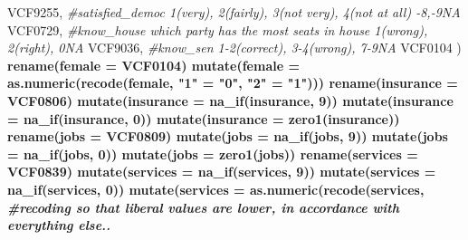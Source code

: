 \documentclass[
]{article}
\newenvironment{Shaded}{\begin{snugshade}}{\end{snugshade}}
\newcommand{\CommentTok}[1]{\textcolor[rgb]{0.56,0.35,0.01}{\textit{#1}}}
\newcommand{\DataTypeTok}[1]{\textcolor[rgb]{0.13,0.29,0.53}{#1}}
\newcommand{\DecValTok}[1]{\textcolor[rgb]{0.00,0.00,0.81}{#1}}
\newcommand{\KeywordTok}[1]{\textcolor[rgb]{0.13,0.29,0.53}{\textbf{#1}}}
\newcommand{\NormalTok}[1]{#1}
\newcommand{\OperatorTok}[1]{\textcolor[rgb]{0.81,0.36,0.00}{\textbf{#1}}}
\newcommand{\StringTok}[1]{\textcolor[rgb]{0.31,0.60,0.02}{#1}}
\begin{document}
\begin{Shaded}
\begin{Highlighting}[]
{{{{{{{{{{{{{{{\NormalTok{                 VCF9255, }\CommentTok{#satisfied_democ 1(very), 2(fairly), 3(not very), 4(not at all) -8,-9NA}
\NormalTok{                 VCF0729, }\CommentTok{#know_house which party has the most seats in house 1(wrong), 2(right), 0NA}
\NormalTok{                 VCF9036, }\CommentTok{#know_sen 1-2(correct), 3-4(wrong), 7-9NA}
\NormalTok{                 VCF0104}
\NormalTok{    )}\OperatorTok{%>%}
\StringTok{    }\KeywordTok{rename}\NormalTok{(}\DataTypeTok{female =}\NormalTok{ VCF0104)}\OperatorTok{%>%}
\StringTok{    }\KeywordTok{mutate}\NormalTok{(}\DataTypeTok{female =} \KeywordTok{as.numeric}\NormalTok{(}\KeywordTok{recode}\NormalTok{(female, }
                                                                        \StringTok{"1"}\NormalTok{ =}\StringTok{ "0"}\NormalTok{,}
                                                                        \StringTok{"2"}\NormalTok{ =}\StringTok{ "1"}\NormalTok{)))}\OperatorTok{%>%}
\StringTok{    }\KeywordTok{rename}\NormalTok{(}\DataTypeTok{insurance =}\NormalTok{ VCF0806)}\OperatorTok{%>%}
\StringTok{    }\KeywordTok{mutate}\NormalTok{(}\DataTypeTok{insurance =} \KeywordTok{na_if}\NormalTok{(insurance, }\DecValTok{9}\NormalTok{))}\OperatorTok{%>%}
\StringTok{    }\KeywordTok{mutate}\NormalTok{(}\DataTypeTok{insurance =} \KeywordTok{na_if}\NormalTok{(insurance, }\DecValTok{0}\NormalTok{))}\OperatorTok{%>%}
\StringTok{    }\KeywordTok{mutate}\NormalTok{(}\DataTypeTok{insurance =} \KeywordTok{zero1}\NormalTok{(insurance))}\OperatorTok{%>%}\CommentTok{#standardize between 0-1}
\StringTok{    }\KeywordTok{rename}\NormalTok{(}\DataTypeTok{jobs =}\NormalTok{ VCF0809)}\OperatorTok{%>%}
\StringTok{    }\KeywordTok{mutate}\NormalTok{(}\DataTypeTok{jobs =} \KeywordTok{na_if}\NormalTok{(jobs, }\DecValTok{9}\NormalTok{))}\OperatorTok{%>%}
\StringTok{    }\KeywordTok{mutate}\NormalTok{(}\DataTypeTok{jobs =} \KeywordTok{na_if}\NormalTok{(jobs, }\DecValTok{0}\NormalTok{))}\OperatorTok{%>%}
\StringTok{    }\KeywordTok{mutate}\NormalTok{(}\DataTypeTok{jobs =} \KeywordTok{zero1}\NormalTok{(jobs))}\OperatorTok{%>%}
\StringTok{    }\KeywordTok{rename}\NormalTok{(}\DataTypeTok{services =}\NormalTok{ VCF0839)}\OperatorTok{%>%}
\StringTok{    }\KeywordTok{mutate}\NormalTok{(}\DataTypeTok{services =} \KeywordTok{na_if}\NormalTok{(services, }\DecValTok{9}\NormalTok{))}\OperatorTok{%>%}
\StringTok{    }\KeywordTok{mutate}\NormalTok{(}\DataTypeTok{services =} \KeywordTok{na_if}\NormalTok{(services, }\DecValTok{0}\NormalTok{))}\OperatorTok{%>%}
\StringTok{    }\KeywordTok{mutate}\NormalTok{(}\DataTypeTok{services =} \KeywordTok{as.numeric}\NormalTok{(}\KeywordTok{recode}\NormalTok{(services, }\CommentTok{#recoding so that liberal values are lower, in accordance with everything else..}
}}}}}}}}}}}}}}}}}}}}}}}}}}}}}
\end{Highlighting}
\end{Shaded}
\end{document}

